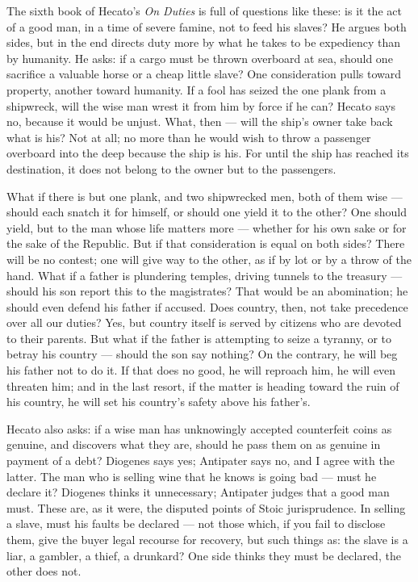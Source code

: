  The sixth book of Hecato's \textit{On Duties} is full of questions like these: is it the act of a good man, in a time of severe famine, not to feed his slaves? He argues both sides, but in the end directs duty more by what he takes to be expediency than by humanity. He asks: if a cargo must be thrown overboard at sea, should one sacrifice a valuable horse or a cheap little slave? One consideration pulls toward property, another toward humanity. If a fool has seized the one plank from a shipwreck, will the wise man wrest it from him by force if he can? Hecato says no, because it would be unjust. What, then — will the ship's owner take back what is his? Not at all; no more than he would wish to throw a passenger overboard into the deep because the ship is his. For until the ship has reached its destination, it does not belong to the owner but to the passengers.

 What if there is but one plank, and two shipwrecked men, both of them wise — should each snatch it for himself, or should one yield it to the other? One should yield, but to the man whose life matters more — whether for his own sake or for the sake of the Republic. But if that consideration is equal on both sides? There will be no contest; one will give way to the other, as if by lot or by a throw of the hand. What if a father is plundering temples, driving tunnels to the treasury — should his son report this to the magistrates? That would be an abomination; he should even defend his father if accused. Does country, then, not take precedence over all our duties? Yes, but country itself is served by citizens who are devoted to their parents. But what if the father is attempting to seize a tyranny, or to betray his country — should the son say nothing? On the contrary, he will beg his father not to do it. If that does no good, he will reproach him, he will even threaten him; and in the last resort, if the matter is heading toward the ruin of his country, he will set his country's safety above his father's.

 Hecato also asks: if a wise man has unknowingly accepted counterfeit coins as genuine, and discovers what they are, should he pass them on as genuine in payment of a debt? Diogenes says yes; Antipater says no, and I agree with the latter. The man who is selling wine that he knows is going bad — must he declare it? Diogenes thinks it unnecessary; Antipater judges that a good man must. These are, as it were, the disputed points of Stoic jurisprudence. In selling a slave, must his faults be declared — not those which, if you fail to disclose them, give the buyer legal recourse for recovery, but such things as: the slave is a liar, a gambler, a thief, a drunkard? One side thinks they must be declared, the other does not.

